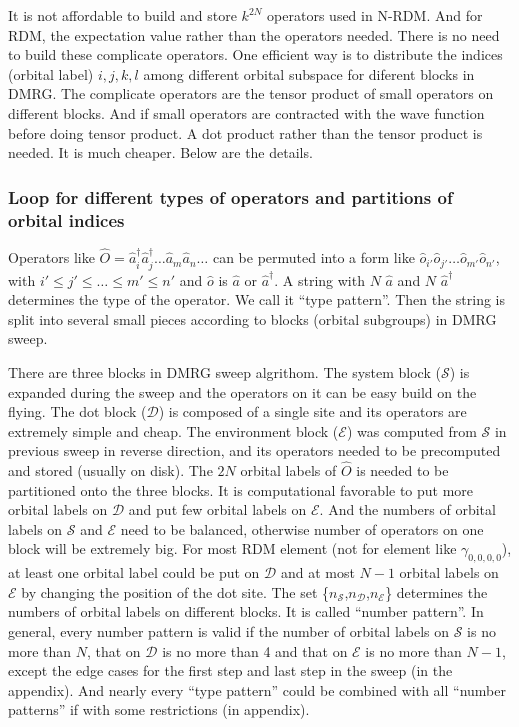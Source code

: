 It is not affordable to build and store $k^{2N}$ operators used in N-RDM.
And for RDM, the expectation value rather than the operators needed. There is no need to build these complicate operators.
One efficient way is to distribute the indices (orbital label) $i,j,k,l$ among different orbital subspace for diferent blocks in DMRG.\cite{ghosh_orbital_2008,zgid_density_2008} 
The complicate operators are the tensor product of small operators on different blocks. And if small operators are contracted with the wave function before doing tensor product. A dot product rather than the tensor product is needed. It is much cheaper. Below are the details.

\subsubsection{Loop for different types of operators and partitions of orbital indices}

Operators like $\hat{O} = \hat{a}^\dagger_i\hat{a}^\dagger_j\dots \hat{a}_m\hat{a}_n\dots$ can be permuted into a form like $\hat{o}_{i'}\hat{o}_{j'}\dots \hat{o}_{m'}\hat{o}_{n'}$, with $i'\le j'\le \dots \le m' \le n'$ and $\hat{o}$ is $\hat{a}$ or $\hat{a}^\dagger$. A string with $N$ $\hat{a}$ and $N$ $\hat{a}^\dagger$ determines the type of the operator. 
We call it ``type pattern''. 
Then the string is split into several small pieces according to blocks (orbital subgroups) in DMRG sweep. 

There are three blocks in DMRG sweep algrithom.
The system block ($\mathcal{S}$) is expanded during the sweep and the operators on it can be easy build on the flying. The dot block ($\mathcal{D}$) is composed of a single site and its operators are extremely simple and cheap. The environment block ($\mathcal{E}$) was computed from $\mathcal{S}$ in previous sweep in reverse direction, and its operators needed to be precomputed and stored (usually on disk). 
The $2N$ orbital labels of $\hat{O}$ is needed to be partitioned onto the three blocks. It is computational favorable to put more orbital labels on $\mathcal{D}$ and put few orbital labels on $\mathcal{E}$. And the numbers of orbital labels on $\mathcal{S}$ and $\mathcal{E}$ need to be balanced, otherwise number of operators on one block will be extremely big. For most RDM element (not for element like $\gamma_{0,0,0,0}$), at least one orbital label could be put on $\mathcal{D}$ and at most $N-1$ orbital labels on $\mathcal{E}$ by changing the position of the dot site. The set \{$n_\mathcal{S}$,$n_\mathcal{D}$,$n_\mathcal{E}$\} determines the numbers of orbital labels on different blocks. It is called ``number pattern''. In general, every number pattern is valid if the number of orbital labels on $\mathcal{S}$ is no more than $N$, that on $\mathcal{D}$ is no more than 4 and that on $\mathcal{E}$ is no more than $N-1$, except the edge cases for the first step and last step in the sweep (in the appendix).
And nearly every ``type pattern'' could be combined with all ``number patterns'' if with some restrictions (in appendix).   


